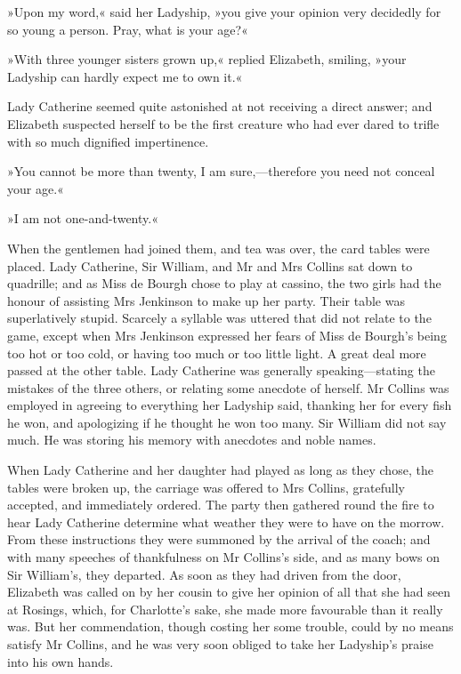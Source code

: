 »Upon my word,« said her Ladyship, »you give your opinion very decidedly for so young a person. Pray, what is your age?«

»With three younger sisters grown up,« replied Elizabeth, smiling, »your Ladyship can hardly expect me to own it.«

Lady Catherine seemed quite astonished at not receiving a direct answer; and Elizabeth suspected herself to be the first creature who had ever dared to trifle with so much dignified impertinence.

»You cannot be more than twenty, I am sure,—therefore you need not conceal your age.«

»I am not one-and-twenty.«

When the gentlemen had joined them, and tea was over, the card tables were placed. Lady Catherine, Sir William, and Mr and Mrs Collins sat down to quadrille; and as Miss de Bourgh chose to play at cassino, the two girls had the honour of assisting Mrs Jenkinson to make up her party. Their table was superlatively stupid. Scarcely a syllable was uttered that did not relate to the game, except when Mrs Jenkinson expressed her fears of Miss de Bourgh's being too hot or too cold, or having too much or too little light. A great deal more passed at the other table. Lady Catherine was generally speaking—stating the mistakes of the three others, or relating some anecdote of herself. Mr Collins was employed in agreeing to everything her Ladyship said, thanking her for every fish he won, and apologizing if he thought he won too many. Sir William did not say much. He was storing his memory with anecdotes and noble names.

When Lady Catherine and her daughter had played as long as they chose, the tables were broken up, the carriage was offered to Mrs Collins, gratefully accepted, and immediately ordered. The party then gathered round the fire to hear Lady Catherine determine what weather they were to have on the morrow. From these instructions they were summoned by the arrival of the coach; and with many speeches of thankfulness on Mr Collins's side, and as many bows on Sir William's, they departed. As soon as they had driven from the door, Elizabeth was called on by her cousin to give her opinion of all that she had seen at Rosings, which, for Charlotte's sake, she made more favourable than it really was. But her commendation, though costing her some trouble, could by no means satisfy Mr Collins, and he was very soon obliged to take her Ladyship's praise into his own hands.

